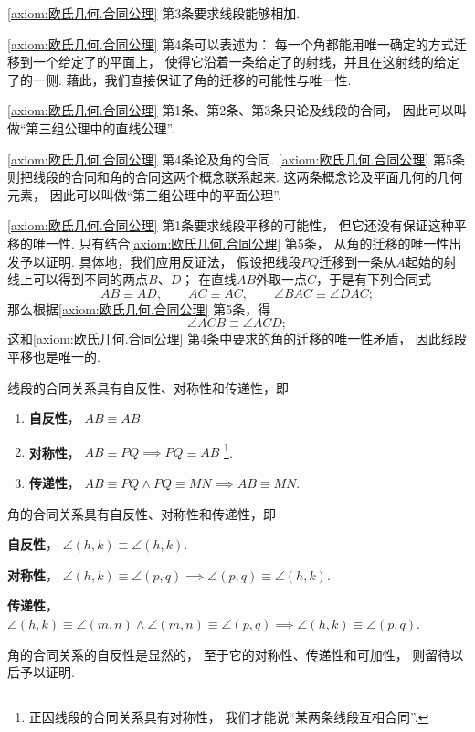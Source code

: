 \cref{axiom:欧氏几何.合同公理} 第3条要求线段能够相加.

\cref{axiom:欧氏几何.合同公理} 第4条可以表述为：
每一个角都能用唯一确定的方式迁移到一个给定了的平面上，
使得它沿着一条给定了的射线，并且在这射线的给定了的一侧.
藉此，我们直接保证了角的迁移的可能性与唯一性.

\cref{axiom:欧氏几何.合同公理} 第1条、第2条、第3条只论及线段的合同，
因此可以叫做“第三组公理中的直线公理”.

\cref{axiom:欧氏几何.合同公理} 第4条论及角的合同.
\cref{axiom:欧氏几何.合同公理} 第5条则把线段的合同和角的合同这两个概念联系起来.
这两条概念论及平面几何的几何元素，
因此可以叫做“第三组公理中的平面公理”.

\cref{axiom:欧氏几何.合同公理} 第1条要求线段平移的可能性，
但它还没有保证这种平移的唯一性.
只有结合\cref{axiom:欧氏几何.合同公理} 第5条，
从角的迁移的唯一性出发予以证明.
具体地，我们应用反证法，
假设把线段\(PQ\)迁移到一条从\(A\)起始的射线上可以得到不同的两点\(B\)、\(D\)；
在直线\(AB\)外取一点\(C\)，于是有下列合同式
\begin{equation*}
AB \equiv AD, \qquad
AC \equiv AC, \qquad
\angle BAC \equiv \angle DAC;
\end{equation*}
那么根据\cref{axiom:欧氏几何.合同公理} 第5条，得
\begin{equation*}
\angle ACB \equiv \angle ACD;
\end{equation*}
这和\cref{axiom:欧氏几何.合同公理} 第4条中要求的角的迁移的唯一性矛盾，
因此线段平移也是唯一的.

\begin{property}
线段的合同关系具有自反性、对称性和传递性，即
\begin{enumerate}
\item {\rm\bf 自反性}，
\(AB \equiv AB\).

\item {\rm\bf 对称性}，
\(AB \equiv PQ \implies PQ \equiv AB\)
\footnote{%
正因线段的合同关系具有对称性，
我们才能说“某两条线段互相合同”.
}.

\item {\rm\bf 传递性}，
\(AB \equiv PQ \land PQ \equiv MN \implies AB \equiv MN\).
\end{enumerate}
\end{property}

\begin{property}
角的合同关系具有自反性、对称性和传递性，即
\item {\rm\bf 自反性}，
\(\angle(h,k) \equiv \angle(h,k)\).

\item {\rm\bf 对称性}，
\(\angle(h,k) \equiv \angle(p,q)
\implies
\angle(p,q) \equiv \angle(h,k)\).

\item {\rm\bf 传递性}，
\(\angle(h,k) \equiv \angle(m,n)
\land
\angle(m,n) \equiv \angle(p,q)
\implies
\angle(h,k) \equiv \angle(p,q)\).
\end{property}
角的合同关系的自反性是显然的，
至于它的对称性、传递性和可加性，
则留待以后予以证明.
